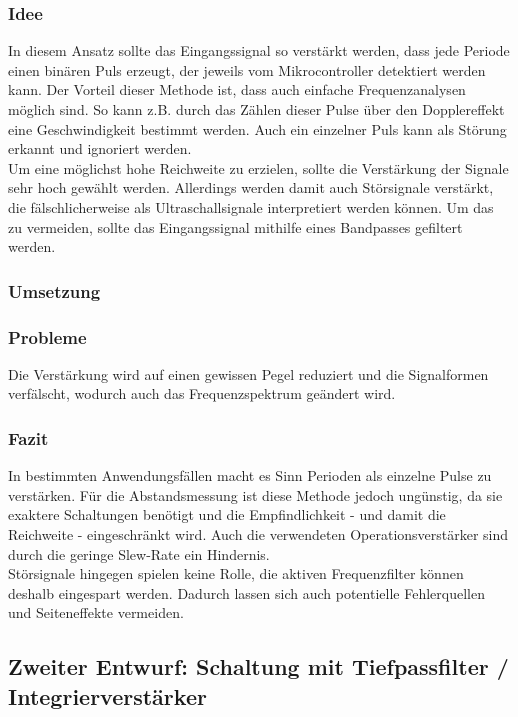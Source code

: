 \subsubsection{Idee}
In diesem Ansatz sollte das Eingangssignal so verstärkt werden, dass jede Periode einen binären Puls erzeugt, der jeweils vom Mikrocontroller detektiert werden kann. Der Vorteil dieser Methode ist, dass auch einfache Frequenzanalysen möglich sind. So kann z.B. durch das Zählen dieser Pulse über den Dopplereffekt eine Geschwindigkeit bestimmt werden. Auch ein einzelner Puls kann als Störung erkannt und ignoriert werden.\\
Um eine möglichst hohe Reichweite zu erzielen, sollte die Verstärkung der Signale sehr hoch gewählt werden. Allerdings werden damit auch Störsignale verstärkt, die fälschlicherweise als Ultraschallsignale interpretiert werden können. Um das zu vermeiden, sollte das Eingangssignal mithilfe eines Bandpasses gefiltert werden.

\subsubsection{Umsetzung}


\subsubsection{Probleme}
Die Verstärkung wird auf einen gewissen Pegel reduziert und die Signalformen verfälscht, wodurch auch das Frequenzspektrum geändert wird.\\

\subsubsection{Fazit}
In bestimmten Anwendungsfällen macht es Sinn Perioden als einzelne Pulse zu verstärken. Für die Abstandsmessung ist diese Methode jedoch ungünstig, da sie exaktere Schaltungen benötigt und die Empfindlichkeit - und damit die Reichweite - eingeschränkt wird. Auch die verwendeten Operationsverstärker sind durch die geringe Slew-Rate ein Hindernis.\\
Störsignale hingegen spielen keine Rolle, die aktiven Frequenzfilter können deshalb eingespart werden. Dadurch lassen sich auch potentielle Fehlerquellen und Seiteneffekte vermeiden.



\subsection{Zweiter Entwurf: Schaltung mit Tiefpassfilter / Integrierverstärker}

